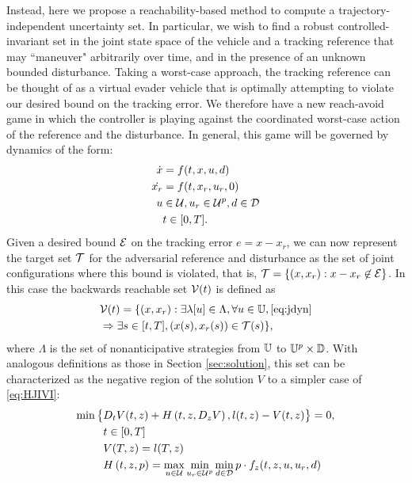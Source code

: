 Instead, here we propose a reachability-based method to compute a trajectory-independent uncertainty set. In particular, we wish to find a robust controlled-invariant set in the joint state space of the vehicle and a tracking reference that may ``maneuver" arbitrarily over time, and in the presence of an unknown bounded disturbance. Taking a worst-case approach, the tracking reference can be thought of as a virtual evader vehicle that is optimally attempting to violate our desired bound on the tracking error. We therefore have a new reach-avoid game in which the controller is playing against the coordinated worst-case action of the reference and the disturbance. In general, this game will be governed by dynamics of the form:
\begin{equation}
\label{eq:jdyn} %
\begin{aligned}
\dot{x} &= f(t, x, u, d) \\
\dot{x_r} &=f(t,x_r,u_r,0)\\
u &\in \cset, u_r\in\cset^p, d \in \dset \\
&t \in [0, T].
\end{aligned}
\end{equation}
Given a desired bound $\mathcal{E}$ on the tracking error $e=x-x_r$, we can now represent the target set $\mathcal{T}$ for the adversarial reference and disturbance as the set of joint configurations where this bound is violated, that is, $\mathcal{T} = \{(x,x_r): x-x_r\not\in\mathcal{E}\}$. In this case the backwards reachable set $\mathcal{V}(t)$ is defined as
\begin{equation}
\label{eq:brs}
\begin{aligned}
&\mathcal{V}(t) = \{(x,x_r):  \exists \lambda[u] \in \Lambda, \forall u \in \mathbb{U}, \eqref{eq:jdyn} \\
&\Rightarrow \exists s \in [t, T], (x(s),x_r(s)) \in \mathcal{T}(s)\},
\end{aligned}
\end{equation}
where $\Lambda$ is the set of nonanticipative strategies from $\mathbb{U}$ to $\mathbb{U}^p\times \mathbb{D}$.
With analogous definitions as those in Section \ref{sec:solution}, this set can be characterized as the negative region of the solution $V$ to a simpler case of \eqref{eq:HJIVI}:
\begin{equation}
\label{eq:HJIVI_track}
\begin{aligned}
\min\big\{&D_t V(t, z) + H\left(t, z, D_z V\right), l(t,z) - V(t, z)\big\}= 0,\\&  t\in[0,T]\\
&V(T, z) = l(T, z)\\
&H\left(t, z, p\right) = \max_{u \in \mathcal{U}} \min_{u_r \in\mathcal{U}^p} \min_{d \in \mathcal{D}} p \cdot f_z(t,z,u,u_r,d)
\end{aligned}
\end{equation}
